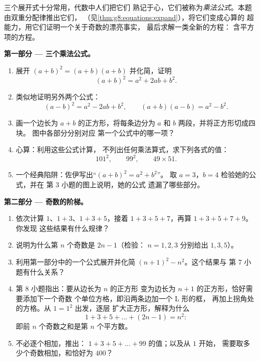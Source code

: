 \begin{problem}[{周末问题 --- $(a+b)^2$，$(a-b)^2$，
$(a+b)(a-b)$，以及奇数求和 $1 + 3 + 5 + \dots + (2n-1) = n^2$}]
\label{pb:g8:equations:1}
三个展开式十分常用，代数中人们把它们
熟记于心，它们被称为\emph{乘法公式}。本题
由双重分配律推出它们，
（见\cref{thm:g8:equations:expand}），将它们变成心算的
超能力，用它们证明一个关于奇数的漂亮事实，
最后求解一类全新的方程：
含平方项的方程。

\medskip
\noindent\textbf{第一部分 --- 三个乘法公式。}
\begin{enumerate}
  \item 展开 $(a + b)^2 = (a + b)(a + b)$ 并化简，证明
        \[
        (a + b)^2 = a^2 + 2ab + b^2 .
        \]
  \item 类似地证明另外两个公式：
        \[
        (a - b)^2 = a^2 - 2ab + b^2,
        \qquad
        (a + b)(a - b) = a^2 - b^2 .
        \]
  \item 画一个边长为 $a + b$ 的正方形，将每条边分为 $a$
        和 $b$ 两段，并将正方形切成四块。
        图中各部分分别对应
        第一个公式中的哪一项？
  \item 心算：利用这些公式计算，
        不列出任何乘法算式，求下列各式的值：
        \[
        101^2, \qquad 99^2, \qquad 49 \times 51 .
        \]
  \item 一个经典陷阱：佐伊写出“$(a + b)^2 = a^2 + b^2$”。
        取 $a = 3$，$b = 4$ 检验她的公式，并在
        第 3 小题的图上说明，她的公式
        遗漏了哪些部分。
\end{enumerate}

\medskip
\noindent\textbf{第二部分 --- 奇数的阶梯。}
\begin{enumerate}[resume]
  \item 依次计算 $1$、$1 + 3$、$1 + 3 + 5$，接着
        $1 + 3 + 5 + 7$，再算 $1 + 3 + 5 + 7 + 9$。你发现
        这些结果有什么规律？
  \item 说明为什么第 $n$ 个奇数是 $2n - 1$（检验：
        $n = 1, 2, 3$ 分别给出 $1, 3, 5$）。
  \item 利用第一部分中的一个公式展开并化简
        $(n + 1)^2 - n^2$。这个结果与
        第 7 小题有什么关系？
  \item 第 8 小题指出：要从边长为 $n$ 的正方形
        变为边长为 $n + 1$ 的正方形，恰好需要添加下一个奇数
        个单位方格，即沿两条边加一个 L 形的框，
        再加上拐角处的方格。从 $1 = 1^2$ 出发，逐层
        扩大正方形，解释为什么
        \[
        1 + 3 + 5 + \dots + (2n - 1) = n^2 :
        \]
        即前 $n$ 个奇数之和是第 $n$ 个平方数。
  \item 不必逐个相加，推出：
        $1 + 3 + 5 + \dots + 99$ 的值；以及从 $1$ 开始，
        需要取多少个奇数相加，和恰好为 $400$？
\end{enumerate}


\end{problem}
